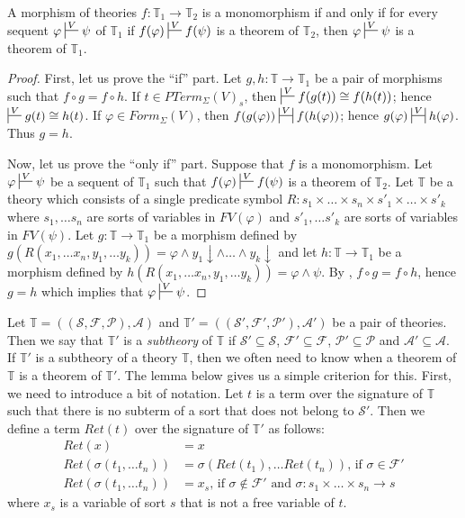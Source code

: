 \documentclass[reqno]{amsart}
\theoremstyle{definition}
\theoremstyle{remark}
\numberwithin{figure}{section}
\begin{document}
\begin{prop}[mono]
A morphism of theories $f : \mathbb{T}_1 \to \mathbb{T}_2$ is a monomorphism if and only if for every sequent $\varphi \sststile{}{V} \psi$ of $\mathbb{T}_1$
if $f(\varphi) \sststile{}{V} f(\psi)$ is a theorem of $\mathbb{T}_2$, then $\varphi \sststile{}{V} \psi$ is a theorem of $\mathbb{T}_1$.
\end{prop}
\begin{proof}
First, let us prove the ``if'' part.
Let $g,h : \mathbb{T} \to \mathbb{T}_1$ be a pair of morphisms such that $f \circ g = f \circ h$.
If $t \in PTerm_\Sigma(V)_s$, then $\sststile{}{V} f(g(t)) \cong f(h(t))$; hence $\sststile{}{V} g(t) \cong h(t)$.
If $\varphi \in Form_\Sigma(V)$, then $f(g(\varphi)) \ssststile{}{V} f(h(\varphi))$; hence $g(\varphi) \ssststile{}{V} h(\varphi)$.
Thus $g = h$.

Now, let us prove the ``only if'' part.
Suppose that $f$ is a monomorphism.
Let $\varphi \sststile{}{V} \psi$ be a sequent of $\mathbb{T}_1$ such that $f(\varphi) \sststile{}{V} f(\psi)$ is a theorem of $\mathbb{T}_2$.
Let $\mathbb{T}$ be a theory which consists of a single predicate symbol $R : s_1 \times \ldots \times s_n \times s'_1 \times \ldots \times s'_k$
where $s_1, \ldots s_n$ are sorts of variables in $FV(\varphi)$ and $s'_1, \ldots s'_k$ are sorts of variables in $FV(\psi)$.
Let $g : \mathbb{T} \to \mathbb{T}_1$ be a morphism defined by $g(R(x_1, \ldots x_n, y_1, \ldots y_k)) = \varphi \land y_1\!\downarrow \land \ldots \land y_k\!\downarrow$ and
let $h : \mathbb{T} \to \mathbb{T}_1$ be a morphism defined by $h(R(x_1, \ldots x_n, y_1, \ldots y_k)) = \varphi \land \psi$.
By , $f \circ g = f \circ h$, hence $g = h$ which implies that $\varphi \sststile{}{V} \psi$.
\end{proof}

Let $\mathbb{T} = ((\mathcal{S},\mathcal{F},\mathcal{P}),\mathcal{A})$ and $\mathbb{T}' = ((\mathcal{S}',\mathcal{F}',\mathcal{P}'),\mathcal{A}')$ be a pair of theories.
Then we say that $\mathbb{T}'$ is a \emph{subtheory} of $\mathbb{T}$ if $\mathcal{S}' \subseteq \mathcal{S}$, $\mathcal{F}' \subseteq \mathcal{F}$, $\mathcal{P}' \subseteq \mathcal{P}$ and $\mathcal{A}' \subseteq \mathcal{A}$.
If $\mathbb{T}'$ is a subtheory of a theory $\mathbb{T}$, then we often need to know when a theorem of $\mathbb{T}$ is a theorem of $\mathbb{T}'$.
The lemma below gives us a simple criterion for this.
First, we need to introduce a bit of notation.
Let $t$ is a term over the signature of $\mathbb{T}$ such that there is no subterm of a sort that does not belong to $\mathcal{S}'$.
Then we define a term $Ret(t)$ over the signature of $\mathbb{T}'$ as follows:
\begin{align*}
Ret(x) & = x \\
Ret(\sigma(t_1, \ldots t_n)) & = \sigma(Ret(t_1), \ldots Ret(t_n)) \text{, if $\sigma \in \mathcal{F}'$} \\
Ret(\sigma(t_1, \ldots t_n)) & = x_s \text{, if $\sigma \notin \mathcal{F}'$ and $\sigma : s_1 \times \ldots \times s_n \to s$}
\end{align*}
where $x_s$ is a variable of sort $s$ that is not a free variable of $t$.
\end{document}
